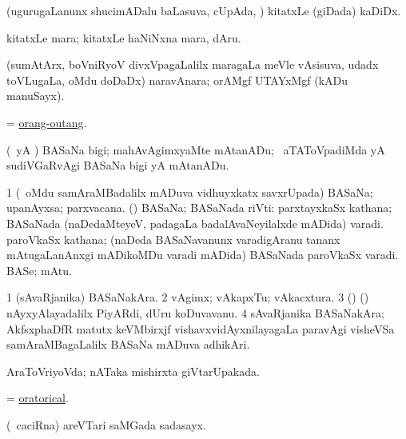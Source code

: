 \bentry
{}
\gl{\nA}
\bmng
(ugurugaLanunx shucimADalu baLasuva, cUpAda, \sA) kitatxLe (giDada) kaDiDx. 
\emng
\eentry

\bentry
{}
\gl{\nA}
\bmng
kitatxLe mara; kitatxLe haNiNxna mara, dAru. 
\emng
\eentry

\bentry
{}
\gl{\nA}
\bmng
(sumAtArx, boVniRyoV divxVpagaLalilx maragaLa meVle vAsisuva, udadx toVLugaLa, oMdu doDaDx) naravAnara; orAMgf UTAYxMgf (kADu manuSayx).  
\emng
\eentry

\bentry
{}
\gl{\nA}
\bmng
= \hyperlink{orang-outang}{orang-outang}. 
\emng
\eentry

\bentry
{}
\gl{\akirx}
\bmng
(\hA\ yA \hiV) BASaNa bigi; mahAvAgimxyaMte mAtanADu; \kanmu\ aTAToVpadiMda yA sudiVGaRvAgi BASaNa bigi yA mAtanADu. 
\emng
\eentry

\bentry
{}
\gl{\nA}
\bmng
\bnum
\num{1} (\kanmu\ oMdu samAraMBadalilx mADuva vidhuyxkatx savxrUpada) BASaNa; upanAyxsa; parxvacana. 
 (\vAyx) 
\banum
{} BASaNa; BASaNada riVti:  parxtayxkaSx kathana; BASaNada (naDedaMteyeV, padagaLa badalAvaNeyilalxde mADida) varadi.  paroVkaSx kathana; (naDeda BASaNavanunx varadigAranu tananx mAtugaLanAnxgi mADikoMDu varadi mADida) BASaNada paroVkaSx varadi. 
 BASe; mAtu. 
\eanum
\numie
\enum
\emng
\eentry

\bentry
{}
\gl{\nA}
\bmng
\bnum
\num{1} (sAvaRjanika) BASaNakAra. 
\num{2} vAgimx; vAkapxTu; vAkacxtura. 
\num{3} (\ame) (\pArxparx) nAyxyAlayadalilx PiyARdi, dUru koDuvavanu. 
\num{4} sAvaRjanika BASaNakAra; AkfsxphaDfR matutx keVMbirxjf vishavxvidAyxnilayagaLa paravAgi visheVSa samAraMBagaLalilx BASaNa mADuva adhikAri. 
\enum
\emng
\eentry

\bentry
{}
\gl{\gu}
\bmng
AraToVriyoVda; nATaka mishirxta giVtarUpakada. 
\emng
\eentry

\bentry
{}
\gl{\gu}
\bmng
= \hyperlink{oratorical}{oratorical}. 
\emng
\eentry

\bentry
{}
\gl{\nA}
\bmng
(\roVkAyx\ caciRna) areVTari saMGada sadasayx. 
\emng
\eentry


